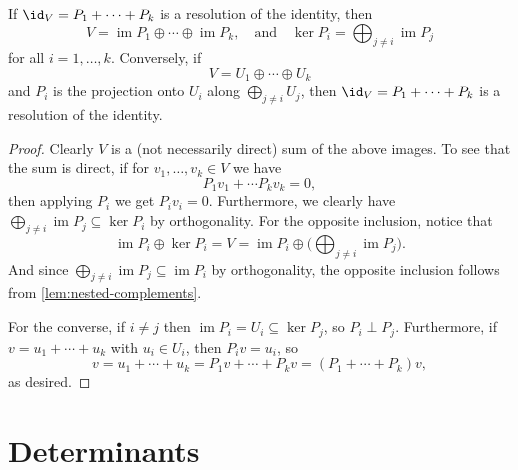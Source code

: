 \documentclass[a4paper, 11pt]{memoir}
\theoremstyle{plaincustomnumber}
\theoremstyle{changedotbreakcustomnumber}
\newcommand{\im}{\operatorname{im}}
\begin{document}
\begin{proposition}
    \label{prop:resolution-of-the-identity-characterisation}
    If $\id_V = P_1 + \cdots + P_k$ is a resolution of the identity, then
    \begin{equation*}
        V
            = \im P_1 \oplus \cdots \oplus \im P_k,
        \quad \text{and} \quad
        \ker P_i
            = \bigoplus_{j \neq i} \im P_j
    \end{equation*}
    for all $i = 1, \ldots, k$. Conversely, if
    \begin{equation*}
        V
            = U_1 \oplus \cdots \oplus U_k
    \end{equation*}
    and $P_i$ is the projection onto $U_i$ along $\bigoplus_{j \neq i} U_j$, then $\id_V = P_1 + \cdots + P_k$ is a resolution of the identity.
\end{proposition}

\begin{proof}
    Clearly $V$ is a (not necessarily direct) sum of the above images. To see that the sum is direct, if for $v_1, \ldots, v_k \in V$ we have
    \begin{equation*}
        P_1 v_1 + \cdots P_k v_k = 0,
    \end{equation*}
    then applying $P_i$ we get $P_i v_i = 0$. Furthermore, we clearly have $\bigoplus_{j \neq i} \im P_j \subseteq \ker P_i$ by orthogonality. For the opposite inclusion, notice that
    \begin{equation*}
        \im P_i \oplus \ker P_i
            = V
            = \im P_i \oplus \biggl( \bigoplus_{j \neq i} \im P_j \biggr).
    \end{equation*}
    And since $\bigoplus_{j \neq i} \im P_j \subseteq \im P_i$ by orthogonality, the opposite inclusion follows from \cref{lem:nested-complements}.

    For the converse, if $i \neq j$ then $\im P_i = U_i \subseteq \ker P_j$, so $P_i \perp P_j$. Furthermore, if $v = u_1 + \cdots + u_k$ with $u_i \in U_i$, then $P_i v = u_i$, so
    \begin{equation*}
        v
            = u_1 + \cdots + u_k
            = P_1 v + \cdots + P_k v
            = (P_1 + \cdots + P_k) v,
    \end{equation*}
    as desired.
\end{proof}





\chapter{Determinants}
\end{document}
